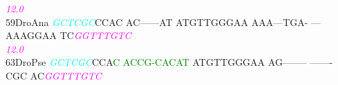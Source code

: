 \documentclass[11pt,twoside,reqno,a4paper]{article}
\begin{document}
{\hspace*{4\charwidth}\hspace*{7\charwidth}\hspace*{1\charwidth}\hspace*{1\charwidth}\hspace*{1\charwidth}\hspace*{1\charwidth}\hspace*{1\charwidth}\hspace*{52\charwidth}\textit{\textcolor{magenta}{12.0}}\hspace*{1\charwidth}\\
59\hspace*{2\charwidth}DroAna	\textit{\textcolor{cyan}{G}}\textit{\textcolor{cyan}{C}}\textit{\textcolor{cyan}{T}}\textit{\textcolor{cyan}{C}}\textit{\textcolor{cyan}{G}}\textit{\textcolor{cyan}{C}}CCAC	AC------AT	ATGTTGGGAA	AAA---TGA-	---AAAGGAA	TC\textit{\textcolor{magenta}{G}}\textit{\textcolor{magenta}{G}}\textit{\textcolor{magenta}{T}}\textit{\textcolor{magenta}{T}}\textit{\textcolor{magenta}{T}}\textit{\textcolor{magenta}{G}}\textit{\textcolor{magenta}{T}}\textit{\textcolor{magenta}{C}}	\\
\hspace*{4\charwidth}\hspace*{7\charwidth}\hspace*{1\charwidth}\hspace*{1\charwidth}\hspace*{1\charwidth}\hspace*{1\charwidth}\hspace*{1\charwidth}\hspace*{52\charwidth}\textit{\textcolor{magenta}{12.0}}\hspace*{1\charwidth}\\
63\hspace*{2\charwidth}DroPse	\textit{\textcolor{cyan}{G}}\textit{\textcolor{cyan}{C}}\textit{\textcolor{cyan}{T}}\textit{\textcolor{cyan}{C}}\textit{\textcolor{cyan}{G}}\textit{\textcolor{cyan}{C}}CCA\textcolor{green}{C}	\textcolor{green}{A}\textcolor{green}{C}\textcolor{green}{C}\textcolor{green}{G}\textcolor{green}{-}\textcolor{green}{C}\textcolor{green}{A}\textcolor{green}{C}\textcolor{green}{A}\textcolor{green}{T}	ATGTTGGGAA	AG--------	-------CGC	AC\textit{\textcolor{magenta}{G}}\textit{\textcolor{magenta}{G}}\textit{\textcolor{magenta}{T}}\textit{\textcolor{magenta}{T}}\textit{\textcolor{magenta}{T}}\textit{\textcolor{magenta}{G}}\textit{\textcolor{magenta}{T}}\textit{\textcolor{magenta}{C}}	\\
}
\end{document}
